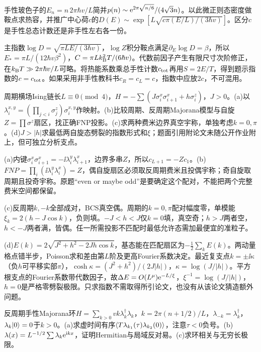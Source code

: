 \begin{exercise}[原题1(a)]
手性玻色子的$E_n=n\,2\pi\hbar v/L$简并$p(n)\sim\mathrm e^{2\pi\sqrt{n/6}}/(4\sqrt3n)$。以此微正则态密度做鞍点求热容，并推广中心荷$c$的$D(E)\sim\exp[L\sqrt{c\pi(E/L)/(3\hbar v)}]$。区分$c$是手性总态计数还是非手性左右各一份。
\end{exercise}
\begin{solution}
主指数$\log D=\sqrt{\pi LE/(3\hbar v)}$，$\log Z$积分鞍点满足$\partial_E\log D=\beta$，所以$E_*=\pi L/(12\hbar v\beta^2)$，$C=\pi Lk_{\mathrm B}^2T/(6\hbar v)$。代数前因子产生有限尺寸次阶修正，在$k_{\mathrm B} T\gg2\pi\hbar v/L$可略。将热能系数乘总手性计数$c_{\rm tot}$再用$S=2E/T$，得到题示指数的$c=c_{\rm tot}$。如果采用非手性教科书$c_R=c_L=c$，指数中应放$2c$，不可混用。
\end{solution}
\begin{exercise}[原题2(a)--(d)]
周期横场Ising链长$L\equiv0\pmod4$，$H=-\sum(J\sigma_i^x\sigma_{i+1}^x+h\sigma_i^z)$，$J>0$。(a)以$\lambda_i^{x,y}=(\prod_{j<i}\sigma_j^z)\sigma_i^{x,y}$作映射。(b)比较周期、反周期Majorana模型与自旋$Z=\prod\sigma^z$扇区，找正确FNP投影。(c)求两种费米边界真空宇称，单独考虑$k=0,\pi$。(d)$J>|h|$求最低两自旋态劈裂的指数形式和$\xi$；题面引用附论文未随公开作业附上，但可独立分析支点。
\end{exercise}
\begin{solution}
(a)内键$\sigma_i^x\sigma_{i+1}^x=-\ii\lambda_i^y\lambda_{i+1}^x$，边界多串$Z$，所以$c_{L+1}=-Zc_1$。(b)$FNP=\prod_i(\ii\lambda_i^y\lambda_i^x)=Z$，偶自旋扇区必须取反周期费米且投偶宇称；奇自旋取周期且投奇宇称。原题“even or maybe odd”是要确定这个配对，不能把两个完整费米空间都保留。

(c)反周期$k,-k$全部成对，BCS真空偶。周期的$k=0,\pi$配对幅度零，单模能$\xi_k=2(h-J\cos k)$，负则填。$-J<h<J$仅$k=0$填，真空奇；$h>J$两者空，$h<-J$两者满，皆偶。任一所需投影不匹配时最低允许态需加最便宜的准粒子。

(d)$E(k)=2\sqrt{J^2+h^2-2Jh\cos k}$，基态能在匹配扇区为$-\frac12\sum_kE(k)$。两动量格点错半步，Poisson求和差由第$L$阶及更高Fourier系数决定。最近复支点$k=\pm\ii\kappa$（负$h$可平移实部$\pi$），$\cosh\kappa=(J^2+h^2)/(2J|h|)$，$\kappa=\log(J/|h|)$。平方根支点的Fourier系数带代数因子，故$\Delta E=O(L^\mu)\mathrm e^{-L/\xi}$，$\xi^{-1}=\log(J/|h|)$，$h=0$是严格零劈裂极限。只求指数不需取得所引论文，也没有从该论文猜造额外问题。
\end{solution}
\begin{exercise}[原题3(a)--(c)]
反周期手性Majorana环$H=\sum_{k>0}vk\lambda_k^\dagger\lambda_k$，$k=2\pi(n+1/2)/L$，$\lambda_{-k}=\lambda_k^\dagger$，$\lambda_k\lvert 0\rangle=0$于$k>0$。(a)求虚时间有序$\langle T\lambda_{k_1}(\tau)\lambda_{k_2}(0)\rangle$，注意$\tau<0$负号。(b)$\lambda(x)=L^{-1/2}\sum\lambda_k\mathrm e^{\mathrm i kx}$，证明Hermitian与局域反对易。(c)求环相关与无穷长极限。
\end{exercise}
